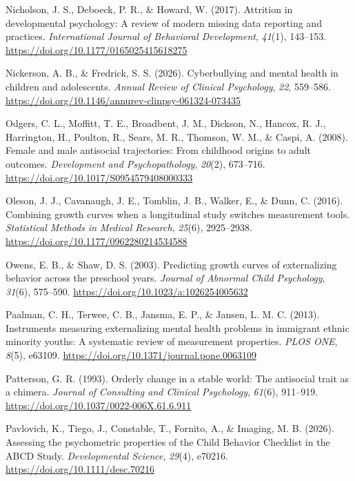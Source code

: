 \documentclass[
  american,
  letterpaper,
  12pt]{article}
\newlength{\cslhangindent}
\newenvironment{CSLReferences}[2] %
 {\begin{list}{}{%
  \setlength{\itemindent}{0pt}
  \setlength{\leftmargin}{0pt}
  \setlength{\parsep}{0pt}
  \ifodd #1
   \setlength{\leftmargin}{\cslhangindent}
   \setlength{\itemindent}{-1\cslhangindent}
  \fi
  \setlength{\itemsep}{#2\baselineskip}}}
 {\end{list}}
\begin{document}
\begin{CSLReferences}{1}{0}
Nicholson, J. S., Deboeck, P. R., \& Howard, W. (2017). Attrition in
developmental psychology: {A} review of modern missing data reporting
and practices. \emph{International Journal of Behavioral Development},
\emph{41}(1), 143--153. \url{https://doi.org/10.1177/0165025415618275}

Nickerson, A. B., \& Fredrick, S. S. (2026). Cyberbullying and mental
health in children and adolescents. \emph{Annual Review of Clinical
Psychology}, \emph{22}, 559--586.
\url{https://doi.org/10.1146/annurev-clinpsy-061324-073435}

Odgers, C. L., Moffitt, T. E., Broadbent, J. M., Dickson, N., Hancox, R.
J., Harrington, H., Poulton, R., Sears, M. R., Thomson, W. M., \& Caspi,
A. (2008). Female and male antisocial trajectories: {From} childhood
origins to adult outcomes. \emph{Development and Psychopathology},
\emph{20}(2), 673--716. \url{https://doi.org/10.1017/S0954579408000333}

Oleson, J. J., Cavanaugh, J. E., Tomblin, J. B., Walker, E., \& Dunn, C.
(2016). Combining growth curves when a longitudinal study switches
measurement tools. \emph{Statistical Methods in Medical Research},
\emph{25}(6), 2925--2938. \url{https://doi.org/10.1177/0962280214534588}

Owens, E. B., \& Shaw, D. S. (2003). Predicting growth curves of
externalizing behavior across the preschool years. \emph{Journal of
Abnormal Child Psychology}, \emph{31}(6), 575--590.
\url{https://doi.org/10.1023/a:1026254005632}

Paalman, C. H., Terwee, C. B., Jansma, E. P., \& Jansen, L. M. C.
(2013). Instruments measuring externalizing mental health problems in
immigrant ethnic minority youths: {A} systematic review of measurement
properties. \emph{PLOS ONE}, \emph{8}(5), e63109.
\url{https://doi.org/10.1371/journal.pone.0063109}

Patterson, G. R. (1993). Orderly change in a stable world: {The}
antisocial trait as a chimera. \emph{Journal of Consulting and Clinical
Psychology}, \emph{61}(6), 911--919.
\url{https://doi.org/10.1037/0022-006X.61.6.911}

Pavlovich, K., Tiego, J., Constable, T., Fornito, A., \& Imaging, M. B.
(2026). Assessing the psychometric properties of the {Child Behavior
Checklist} in the {ABCD Study}. \emph{Developmental Science},
\emph{29}(4), e70216. \url{https://doi.org/10.1111/desc.70216}


\end{CSLReferences}
\end{document}
